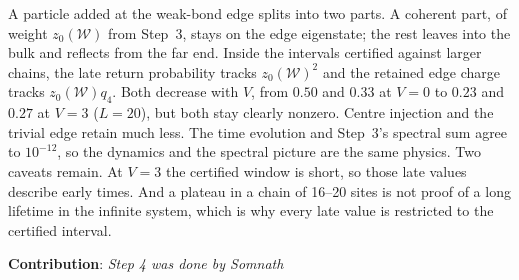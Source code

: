 \documentclass[11pt,a4paper]{article}
\newcommand{\Wcal}{\mathcal{W}}
\begin{document}
A particle added at the weak-bond edge splits into two parts. A coherent part, of weight $z_0(\Wcal)$ from Step~3, stays on the edge eigenstate; the rest leaves into the bulk and reflects from the far end. Inside the intervals certified against larger chains, the late return probability tracks $z_0(\Wcal)^2$ and the retained edge charge tracks $z_0(\Wcal)q_4$. Both decrease with $V$, from $0.50$ and $0.33$ at $V=0$ to $0.23$ and $0.27$ at $V=3$ ($L=20$), but both stay clearly nonzero. Centre injection and the trivial edge retain much less. The time evolution and Step~3's spectral sum agree to $10^{-12}$, so the dynamics and the spectral picture are the same physics. Two caveats remain. At $V=3$ the certified window is short, so those late values describe early times. And a plateau in a chain of 16--20 sites is not proof of a long lifetime in the infinite system, which is why every late value is restricted to the certified interval.
\newline
\space

\textbf{Contribution}: \textit{Step 4 was done by Somnath}
\end{document}
